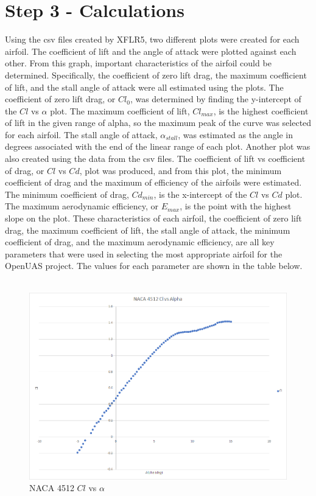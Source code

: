\documentclass{article}
\begin{document}
\section*{Step 3 - Calculations}

Using the csv files created by XFLR5, two different plots were created for each airfoil. The coefficient of lift and the angle of attack were plotted against each other. From this graph, important characteristics of the airfoil could be determined. Specifically, the coefficient of zero lift drag, the maximum coefficient of lift, and the stall angle of attack were all estimated using the plots. The coefficient of zero lift drag, or $Cl_{0}$, was determined by finding the y-intercept of the  $Cl$ vs $\alpha$ plot. The maximum coefficient of lift, $Cl_{max}$, is the highest coefficient of lift in the given range of alpha, so the maximum peak of the curve was selected for each airfoil. The stall angle of attack, $\alpha_{stall}$, was estimated as the angle in degrees associated with the end of the linear range of each plot. Another plot was also created using the data from the csv files. The coefficient of lift vs coefficient of drag, or $Cl$ vs $Cd$, plot was produced, and from this plot, the minimum coefficient of drag and the maximum of efficiency of the airfoils were estimated. The minimum coefficient of drag, $Cd_{min}$, is the x-intercept of the $Cl$ vs $Cd$ plot. The maximum aerodynamic efficiency, or $E_{max}$, is the point with the highest slope on the plot. These characteristics of each airfoil, the coefficient of zero lift drag, the maximum coefficient of lift, the stall angle of attack, the minimum coefficient of drag, and the maximum aerodynamic efficiency, are all key parameters that were used in selecting the most appropriate airfoil for the OpenUAS project. The values for each parameter are shown in the table below.\\\\

\begin{figure}[!h]
\begin{center}
	\includegraphics[scale=0.7]{NACA4512clvsalpha_new.png}
	\caption{NACA 4512 $Cl$ vs $\alpha$}
	\label{Figure 1:}
\end{center}
\end{figure}
\end{document}
